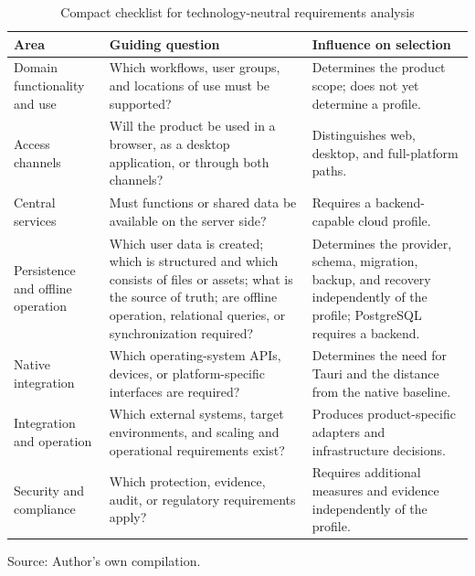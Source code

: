 \begin{table}[H]
  \centering
  \scriptsize
  \renewcommand{\arraystretch}{1.1}
  \caption{Compact checklist for technology-neutral requirements analysis}
  \label{tab:customer-requirement-checklist}
  \begin{tabularx}{\textwidth}{@{}>{\raggedright\arraybackslash}p{}>{\raggedright\arraybackslash}p{}>{\raggedright\arraybackslash}X@{}}
    \toprule
    \textbf{Area} & \textbf{Guiding question} & \textbf{Influence on selection} \\
    \midrule
    Domain functionality and use & Which workflows, user groups, and locations of use must be supported?
      & Determines the product scope; does not yet determine a profile. \\
    Access channels & Will the product be used in a browser, as a desktop application, or through both channels?
      & Distinguishes web, desktop, and full-platform paths. \\
    Central services & Must functions or shared data be available on the server side?
      & Requires a backend-capable cloud profile. \\
    Persistence and offline operation & Which user data is created; which is structured and which consists of files or assets; what is the source of truth; are offline operation, relational queries, or synchronization required?
      & Determines the provider, schema, migration, backup, and recovery independently of the profile; PostgreSQL requires a backend. \\
    Native integration & Which operating-system APIs, devices, or platform-specific interfaces are required?
      & Determines the need for Tauri and the distance from the native baseline. \\
    Integration and operation & Which external systems, target environments, and scaling and operational requirements exist?
      & Produces product-specific adapters and infrastructure decisions. \\
    Security and compliance & Which protection, evidence, audit, or regulatory requirements apply?
      & Requires additional measures and evidence independently of the profile. \\
    \bottomrule
  \end{tabularx}
  \smallskip
  {\footnotesize Source: Author's own compilation.\par}
\end{table}
